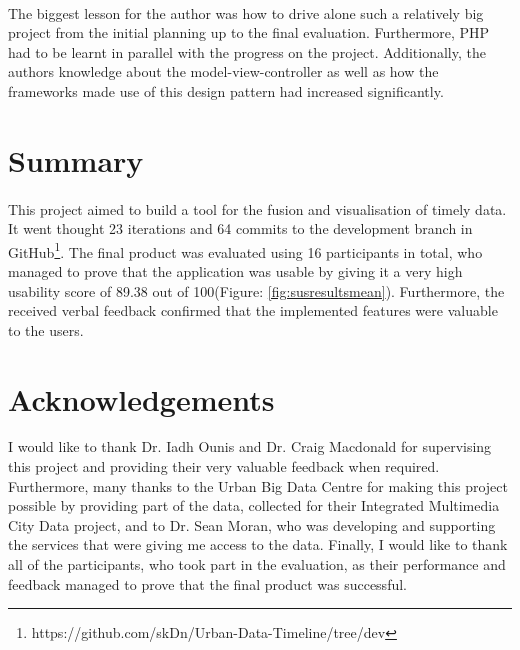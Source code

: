 \documentclass{l4proj}
\begin{document}
\paragraph{}
The biggest lesson for the author was how to drive alone such a relatively big project from the initial planning up to the final evaluation. Furthermore, PHP had to be learnt in parallel with the progress on the project. Additionally, the authors knowledge about the model-view-controller as well as how the frameworks made use of this design pattern had increased significantly. 

\section{Summary}
\paragraph{}
This project aimed to build a tool for the fusion and visualisation of timely data. It went thought 23 iterations and 64 commits to the development branch in GitHub\footnote{https://github.com/skDn/Urban-Data-Timeline/tree/dev}. The final product was evaluated using 16 participants in total, who managed to prove that the application was usable by giving it a very high usability score of 89.38 out of 100(Figure: \ref{fig:susresultsmean}). Furthermore, the received verbal feedback confirmed that the implemented features were valuable to the users. 

\section{Acknowledgements}
I would like to thank Dr. Iadh Ounis and Dr. Craig Macdonald for supervising this project and providing their very valuable feedback when required. Furthermore, many thanks to the Urban Big Data Centre for making this project possible by providing part of the data, collected for their Integrated Multimedia City Data project, and to Dr. Sean Moran, who was developing and supporting the services that were giving me access to the data. Finally, I would like to thank all of the participants, who took part in the evaluation, as their performance and feedback managed to prove that the final product was successful.  





\end{document}
